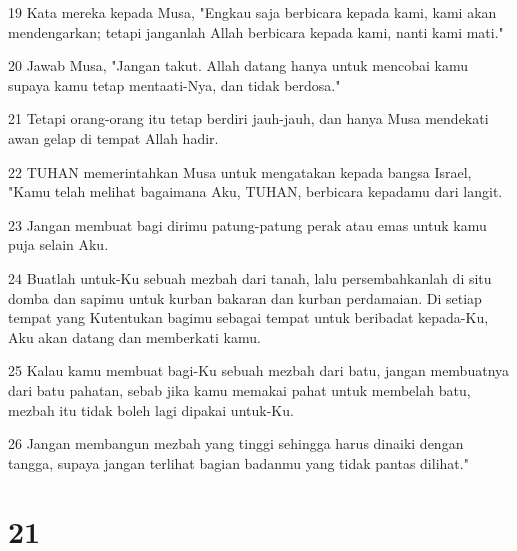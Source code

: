 \par 19 Kata mereka kepada Musa, "Engkau saja berbicara kepada kami, kami akan mendengarkan; tetapi janganlah Allah berbicara kepada kami, nanti kami mati."
\par 20 Jawab Musa, "Jangan takut. Allah datang hanya untuk mencobai kamu supaya kamu tetap mentaati-Nya, dan tidak berdosa."
\par 21 Tetapi orang-orang itu tetap berdiri jauh-jauh, dan hanya Musa mendekati awan gelap di tempat Allah hadir.
\par 22 TUHAN memerintahkan Musa untuk mengatakan kepada bangsa Israel, "Kamu telah melihat bagaimana Aku, TUHAN, berbicara kepadamu dari langit.
\par 23 Jangan membuat bagi dirimu patung-patung perak atau emas untuk kamu puja selain Aku.
\par 24 Buatlah untuk-Ku sebuah mezbah dari tanah, lalu persembahkanlah di situ domba dan sapimu untuk kurban bakaran dan kurban perdamaian. Di setiap tempat yang Kutentukan bagimu sebagai tempat untuk beribadat kepada-Ku, Aku akan datang dan memberkati kamu.
\par 25 Kalau kamu membuat bagi-Ku sebuah mezbah dari batu, jangan membuatnya dari batu pahatan, sebab jika kamu memakai pahat untuk membelah batu, mezbah itu tidak boleh lagi dipakai untuk-Ku.
\par 26 Jangan membangun mezbah yang tinggi sehingga harus dinaiki dengan tangga, supaya jangan terlihat bagian badanmu yang tidak pantas dilihat."

\chapter{21}

